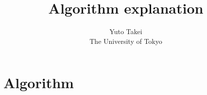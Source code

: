 \documentclass[a4paper,12pt]{article}
\title{Algorithm explanation}
\author{Yuto Takei \\ The University of Tokyo}
\begin{document}
\maketitle

\section{Algorithm}
\end{document}
